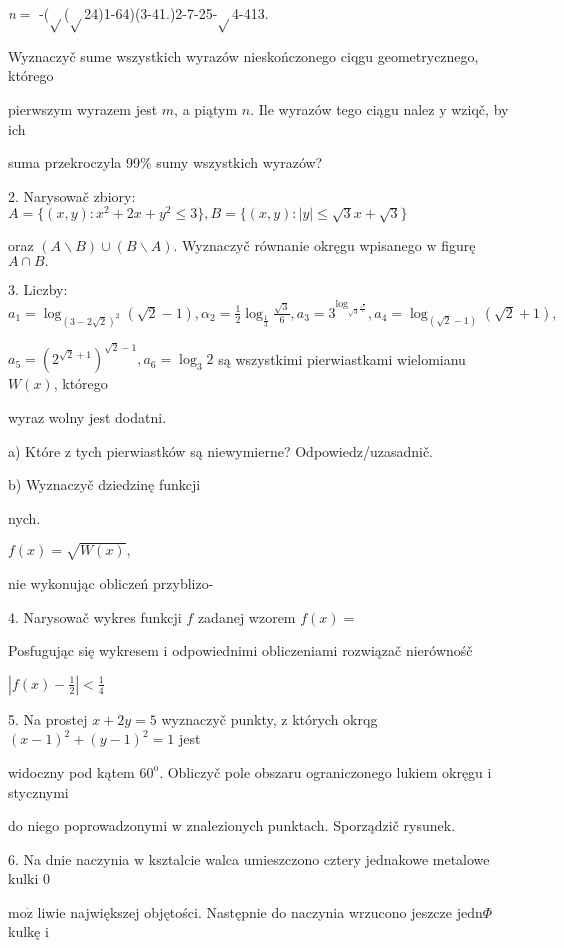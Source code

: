 \documentclass[a4paper,12pt]{article}
\begin{document}
{\it n}$=$ -($\sqrt{}$($\sqrt{}$24)1-64)(3-41.)2-7-25-$\sqrt{}$4-413.

Wyznaczyč sume wszystkich wyrazów nieskończonego ciqgu geometrycznego, którego

pierwszym wyrazem jest $m$, a piątym $n$. Ile wyrazów tego ciągu nalez $\mathrm{y}$ wziqč, by ich

suma przekroczyla 99\% sumy wszystkich wyrazów?

2. Narysowač zbiory: $A=\{(x,y):x^{2}+2x+y^{2}\leq 3\}, B=\{(x,y):|y|\leq\sqrt{3}x+\sqrt{3}\}$

oraz $(A\backslash B)\cup(B\backslash A)$. Wyznaczyč równanie okręgu wpisanego $\mathrm{w}$ figurę $A\cap B.$

3. Liczby: $a_{1}=\log_{(3-2\sqrt{2})^{2}}(\sqrt{2}-1), \displaystyle \alpha_{2}=\frac{1}{2}\log_{\frac{1}{3}}\frac{\sqrt{3}}{6}, a_{3}=3^{\log_{\sqrt{3}^{\frac{\sqrt{6}}{2}}}}, a_{4}=\log_{(\sqrt{2}-1)}(\sqrt{2}+1),$

$a_{5}=(2^{\sqrt{2}+1})^{\sqrt{2}-1}, a_{6}=\log_{3}2$ są wszystkimi pierwiastkami wielomianu $W(x)$, którego

wyraz wolny jest dodatni.

a) Które $\mathrm{z}$ tych pierwiastków są niewymierne? Odpowiedz/uzasadnič.

b) Wyznaczyč dziedzinę funkcji

nych.

$f(x) = \sqrt{W(x)},$

nie wykonując obliczeń przyblizo-

4. Narysowač wykres funkcji $f$ zadanej wzorem $f(x)=$

Posfugując się wykresem $\mathrm{i}$ odpowiednimi obliczeniami rozwiązač nierównośč

$|f(x)-\displaystyle \frac{1}{2}|<\frac{1}{4}$

5. Na prostej $x+2y=5$ wyznaczyč punkty, $\mathrm{z}$ których okrqg $(x-1)^{2}+(y-1)^{2}=1$ jest

widoczny pod kątem $60^{\mathrm{o}}$. Obliczyč pole obszaru ograniczonego lukiem okręgu $\mathrm{i}$ stycznymi

do niego poprowadzonymi $\mathrm{w}$ znalezionych punktach. Sporządzič rysunek.

6. Na dnie naczynia $\mathrm{w}$ ksztalcie walca umieszczono cztery jednakowe metalowe kulki $0$

$\mathrm{m}\mathrm{o}\dot{\mathrm{z}}$ liwie największej objętości. Następnie do naczynia wrzucono jeszcze $\mathrm{j}\mathrm{e}\mathrm{d}\mathrm{n}\Phi$ kulkę $\mathrm{i}$
\end{document}
